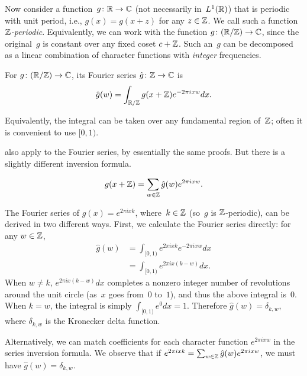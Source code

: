 \documentclass[11pt]{article}
\begin{document}
Now consider a function~$g \colon \mathbb{R} \to \mathbb{C}$ (not necessarily
in~$L^{1}(\mathbb{R})$) that is periodic with unit period, i.e.,
$g(x) = g(x + z)$ for any $z \in \mathbb{Z}$. We call such a function
\emph{$\mathbb{Z}$-periodic}. Equivalently, we can work with the function
$g \colon (\mathbb{R} / \mathbb{Z}) \to \mathbb{C}$, since the original~$g$ is constant over
any fixed coset $c + \mathbb{Z}$. Such an~$g$ can be decomposed as a linear
combination of character functions with \emph{integer} frequencies.

\begin{definition}
  For $g \colon (\mathbb{R} / \mathbb{Z}) \to \mathbb{C}$, its Fourier series
  $\hat{g} \colon \mathbb{Z} \to \mathbb{C}$ is
  \[ \hat{g}(w) = \int_{\mathbb{R}/\mathbb{Z}} g(x+\mathbb{Z}) e^{-2\pi i x w} dx . \]
\end{definition}
Equivalently, the integral can be taken over any fundamental region
of~$\mathbb{Z}$; often it is convenient to use $[0,1)$.

 also apply to the Fourier
series, by essentially the same proofs. But there is a slightly
different inversion formula.

\begin{fact}
  \label{fact:sinversion}
  \[ g(x+\mathbb{Z}) = \sum_{w \in \mathbb{Z}} \hat{g}(w) e^{2\pi i x w} . \]
\end{fact}

\begin{example}
  The Fourier series of $g(x) = e^{2\pi i x k}$, where~$k \in \mathbb{Z}$
  (so~$g$ is $\mathbb{Z}$-periodic), can be derived in two different ways.
  First, we calculate the Fourier series directly: for any $w \in \mathbb{Z}$,
  \begin{align*}
    \hat{g}(w) &= \int_{[0,1)} e^{2\pi i x k} e^{-2\pi i x w} dx \\
               &= \int_{[0,1)} e^{2\pi i x (k - w)} dx .
  \end{align*}
  When $w \neq k$, $e^{2\pi i x (k - w)} dx$ completes a nonzero
  integer number of revolutions around the unit circle (as~$x$ goes
  from~$0$ to~$1$), and thus the above integral is~$0$. When $k=w$,
  the integral is simply $\int_{[0,1)} e^{0} dx = 1$. Therefore
  $\hat{g}(w) = \delta_{k,w}$, where $\delta_{k,w}$ is the Kronecker
  delta function.

  Alternatively, we can match coefficients for each character function
  $e^{2\pi i x w}$ in the series inversion formula. We observe that if
  $e^{2\pi i x k} = \sum_{w \in \mathbb{Z}} \hat{g}(w) e^{2\pi i x w}$, we must
  have $\hat{g}(w) = \delta_{k,w}$.
\end{example}
\end{document}

